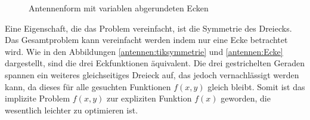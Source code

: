 \begin{figure}
\begin{minipage}[t]{0.45\textwidth}
		\caption{Antennenform mit variablen abgerundeten Ecken}
		\label{antennen:tikabgerundet_kleiner}
	\end{minipage}%
\end{figure}
Eine Eigenschaft, die das Problem vereinfacht, ist die Symmetrie des Dreiecks. 
Das Gesamtproblem kann vereinfacht werden indem nur eine Ecke betrachtet wird. 
Wie in den Abbildungen \ref{antennen:tiksymmetrie} und \ref{antennen:Ecke} dargestellt, sind die drei Eckfunktionen äquivalent. Die drei 
gestrichelten Geraden spannen ein weiteres gleichseitiges Dreieck auf, das 
jedoch vernachlässigt werden kann, da dieses für alle gesuchten Funktionen $f(x,y)$ 
gleich bleibt. Somit ist das implizite Problem $f(x,y)$ zur expliziten Funktion $f(x)$ 
geworden, die wesentlich leichter zu optimieren ist.
